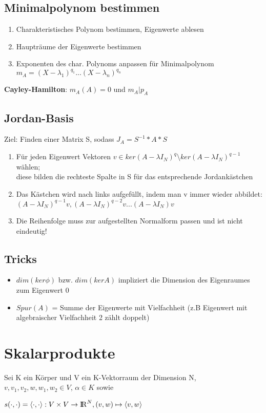 \documentclass[10pt,a4paper]{article}
\def\realnumbers{{\rm I\!R}}
\begin{document}
	\subsection{Minimalpolynom bestimmen}
	\begin{enumerate}
		\item Charakteristisches Polynom bestimmen, Eigenwerte ablesen
		\item Haupträume der Eigenwerte bestimmen
		\item Exponenten des char. Polynoms anpassen für Minimalpolynom $m_A = (X - \lambda_1)^{q_1} ... (X - \lambda_n)^{q_n}$
	\end{enumerate}
	\textbf{Cayley-Hamilton}: $m_A(A) = 0$ und $m_A|p_A$

	\subsection{Jordan-Basis}
	Ziel: Finden einer Matrix S, sodass $J_A = S^{-1} * A * S$
	\begin{enumerate}
		\item Für jeden Eigenwert Vektoren $v \in ker(A - \lambda I_N)^q \setminus ker(A - \lambda I_N)^{q - 1}$ wählen;\\diese bilden die rechteste Spalte in S für das entsprechende Jordankästchen
		\item Das Kästchen wird nach links aufgefüllt, indem man v immer wieder abbildet:\\$(A - \lambda I_N)^{q - 1}v, (A - \lambda I_N)^{q - 2}v ... (A - \lambda I_N)v$
		\item Die Reihenfolge muss zur aufgestellten Normalform passen und ist nicht eindeutig!
	\end{enumerate}

	\subsection{Tricks}
		\begin{itemize}
			\item $dim(ker \phi)$ bzw. $dim(ker A)$ impliziert die Dimension des Eigenraumes zum Eigenwert 0
			\item $Spur(A)$ = Summe der Eigenwerte mit Vielfachheit (z.B Eigenwert mit algebraischer Vielfachheit 2 zählt doppelt)
		\end{itemize}
	
	\section{Skalarprodukte}
	Sei K ein Körper und V ein K-Vektorraum der Dimension N, $v, v_1, v_2, w, w_1, w_2 \in V$, $\alpha \in K$ sowie
	\begin{center}
		$s(\cdot,\cdot) = \langle\cdot,\cdot\rangle: V \times V \rightarrow \realnumbers^N, (v, w) \mapsto \langle v, w\rangle$
	\end{center}
	
\end{document}
